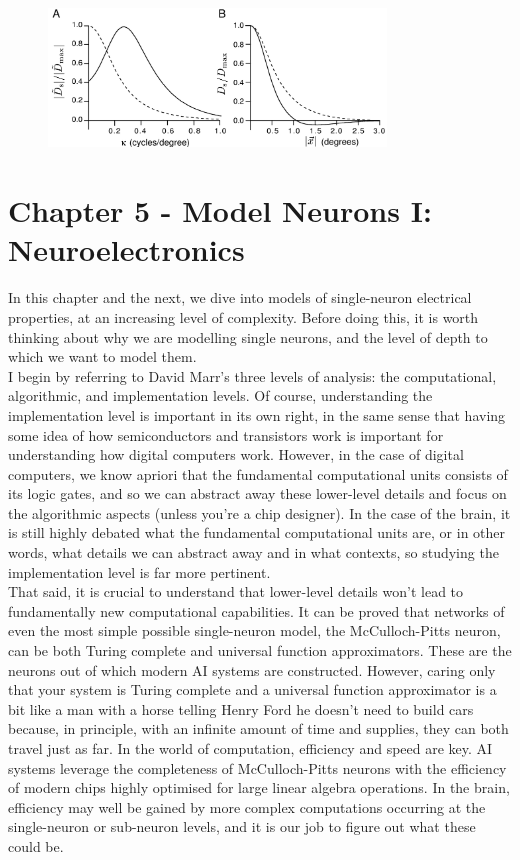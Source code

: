 \documentclass{article}
\begin{document}
\begin{figure}[H]
	\centering
	\includegraphics[width=0.8\textwidth]{receptive.png}
\end{figure}

\section{Chapter 5 - Model Neurons I: Neuroelectronics}

In this chapter and the next, we dive into models of single-neuron electrical  properties, at an increasing level of complexity. Before doing this, it is worth thinking about why we are modelling single neurons, and the level of depth to which we want to model them.\\

I begin by referring to David Marr's three levels of analysis: the computational, algorithmic, and implementation levels. Of course, understanding the implementation level is important in its own right, in the same sense that having some idea of how semiconductors and transistors work is important for understanding how digital computers work. However, in the case of digital computers, we know apriori that the fundamental computational units consists of its logic gates, and so we can abstract away these lower-level details and focus on the algorithmic aspects (unless you're a chip designer). In the case of the brain, it is still highly debated what the fundamental computational units are, or in other words, what details we can abstract away and in what contexts, so studying the implementation level is far more pertinent.\\

That said, it is crucial to understand that lower-level details won't lead to fundamentally new computational capabilities. It can be proved that networks of even the most simple possible single-neuron model, the McCulloch-Pitts neuron, can be both Turing complete and universal function approximators. These are the neurons out of which modern AI systems are constructed. However, caring only that your system is Turing complete and a universal function approximator is a bit like a man with a horse telling Henry Ford he doesn't need to build cars because, in principle, with an infinite amount of time and supplies, they can both travel just as far. In the world of computation, efficiency and speed are key. AI systems leverage the completeness of McCulloch-Pitts neurons with the efficiency of modern chips highly optimised for large linear algebra operations. In the brain, efficiency may well be gained by more complex computations occurring at the single-neuron or sub-neuron levels, and it is our job to figure out what these could be.\\
\end{document}
